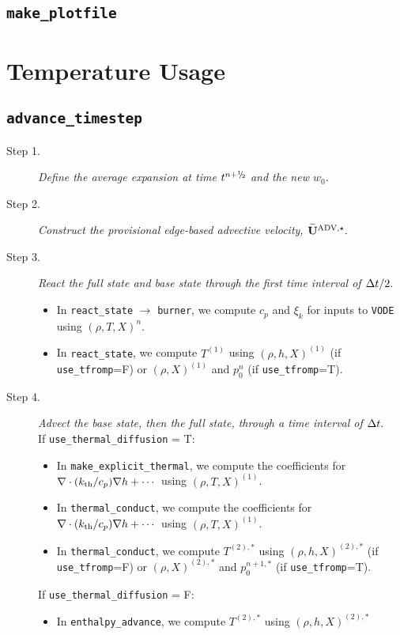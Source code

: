 \subsection{{\tt make\_plotfile}}
\section{Temperature Usage}
\subsection{{\tt advance\_timestep}}
\begin{description}
\item[Step 1.] {\em Define the average expansion at time $t^\nph$ and the new $w_0.$}
\item[Step 2.] {\em Construct the provisional edge-based advective velocity, $\widetilde{\mathbf{U}}^{\mathrm{ADV},\star}.$}
\item[Step 3.] {\em React the full state and base state through the first time interval 
of $\Delta t/2.$}
\begin{itemize}
\item In {\tt react\_state} $\rightarrow$ {\tt burner}, we compute $c_p$ and $\xi_k$ 
for inputs to {\tt VODE} using $(\rho,T,X)^n$.
\item In {\tt react\_state}, we compute $T^{(1)}$ using $(\rho,h,X)^{(1)}$ 
(if {\tt use\_tfromp}=F) or $(\rho,X)^{(1)}$ and $p_0^n$ (if {\tt use\_tfromp}=T).
\end{itemize}
\item[Step 4.] {\em Advect the base state, then the full state, through a time interval 
of $\Delta t.$}\\
If {\tt use\_thermal\_diffusion} = T:
\begin{itemize}
\item In {\tt make\_explicit\_thermal}, we compute the coefficients for 
$\nabla\cdot(k_{\rm th}/c_p)\nabla h + \cdots$ using $(\rho,T,X)^{(1)}$.
\item In {\tt thermal\_conduct}, we compute the coefficients for 
$\nabla\cdot(k_{\rm th}/c_p)\nabla h + \cdots$ using $(\rho,T,X)^{(1)}$.
\item In {\tt thermal\_conduct}, we compute $T^{(2),*}$ using $(\rho,h,X)^{(2),*}$
(if {\tt use\_tfromp}=F) or $(\rho,X)^{(2),*}$ and $p_0^{n+1,*}$ (if {\tt use\_tfromp}=T).
\end{itemize}
If {\tt use\_thermal\_diffusion} = F:
\begin{itemize}
\item In {\tt enthalpy\_advance}, we compute $T^{(2),*}$ using $(\rho,h,X)^{(2),*}$

\end{itemize}
\end{description}
